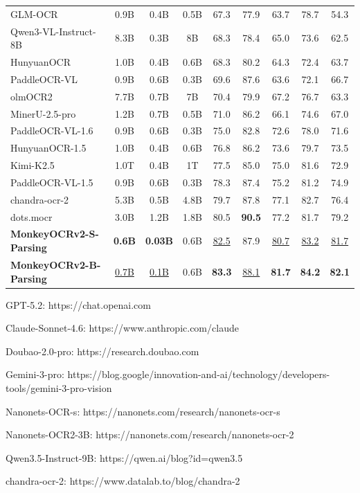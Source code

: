 \documentclass{article}
\begin{document}
\begin{table}[tbp]
{\begin{threeparttable}
\begin{tabular}{l c c c c c c c c}
GLM-OCR~\cite{glm-ocr} & 0.9B & 0.4B & 0.5B & 67.3 & 77.9 & 63.7 & 78.7 & 54.3 \\
Qwen3-VL-Instruct-8B~\cite{qwen3vl} & 8.3B & 0.3B & 8B & 68.3 & 78.4 & 65.0 & 73.6 & 62.5 \\
HunyuanOCR~\cite{hunyuanocr} & 1.0B & 0.4B & 0.6B & 68.3 & 80.2 & 64.3 & 72.4 & 63.7 \\
PaddleOCR-VL~\cite{ppocrvl} & 0.9B & 0.6B & 0.3B & 69.6 & 87.6 & 63.6 & 72.1 & 66.7 \\
olmOCR2~\cite{olmocr2} & 7.7B & 0.7B & 7B & 70.4 & 79.9 & 67.2 & 76.7 & 63.3 \\
MinerU-2.5-pro~\cite{mineru2.5pro} & 1.2B & 0.7B & 0.5B & 71.0 & 86.2 & 66.1 & 74.6 & 67.0 \\
PaddleOCR-VL-1.6~\cite{ppocrvl16} & 0.9B & 0.6B & 0.3B & 75.0 & 82.8 & 72.6 & 78.0 & 71.6 \\
HunyuanOCR-1.5~\cite{hunyuanocr15} & 1.0B & 0.4B & 0.6B & 76.8 & 86.2 & 73.6 & 79.7 & 73.5 \\
Kimi-K2.5~\cite{kimi-k2.5} & 1.0T & 0.4B & 1T & 77.5 & 85.0 & 75.0 & 81.6 & 72.9 \\
PaddleOCR-VL-1.5~\cite{ppocrvl15} & 0.9B & 0.6B & 0.3B & 78.3 & 87.4 & 75.2 & 81.2 & 74.9 \\
chandra-ocr-2\tnote{8} & 5.3B & 0.5B & 4.8B & 79.7 & 87.8 & 77.1 & 82.7 & 76.4 \\
dots.mocr~\cite{dotsmocr} & 3.0B & 1.2B & 1.8B & 80.5 & \textbf{90.5} & 77.2 & 81.7 & 79.2 \\
\textbf{MonkeyOCRv2-S-Parsing} & \textbf{0.6B} & \textbf{0.03B} & 0.6B & \underline{82.5} & 87.9 & \underline{80.7} & \underline{83.2} & \underline{81.7} \\
\textbf{MonkeyOCRv2-B-Parsing} & \underline{0.7B} & \underline{0.1B} & 0.6B & \textbf{83.3} & \underline{88.1} & \textbf{81.7} & \textbf{84.2} & \textbf{82.1} \\
\bottomrule
\end{tabular}
\begin{tablenotes}
\tiny
\setlength{\itemsep}{0pt}
\setlength{\parskip}{0pt}
\raggedright
\item[1] GPT-5.2: https://chat.openai.com
\item[2] Claude-Sonnet-4.6: https://www.anthropic.com/claude
\item[3] Doubao-2.0-pro: https://research.doubao.com
\item[4] Gemini-3-pro: https://blog.google/innovation-and-ai/technology/developers-tools/gemini-3-pro-vision
\item[5] Nanonets-OCR-s: https://nanonets.com/research/nanonets-ocr-s
\item[6] Nanonets-OCR2-3B: https://nanonets.com/research/nanonets-ocr-2
\item[7] Qwen3.5-Instruct-9B: https://qwen.ai/blog?id=qwen3.5
\item[8] chandra-ocr-2: https://www.datalab.to/blog/chandra-2
\end{tablenotes}
\end{threeparttable}
}
\end{table} 
\end{document}
